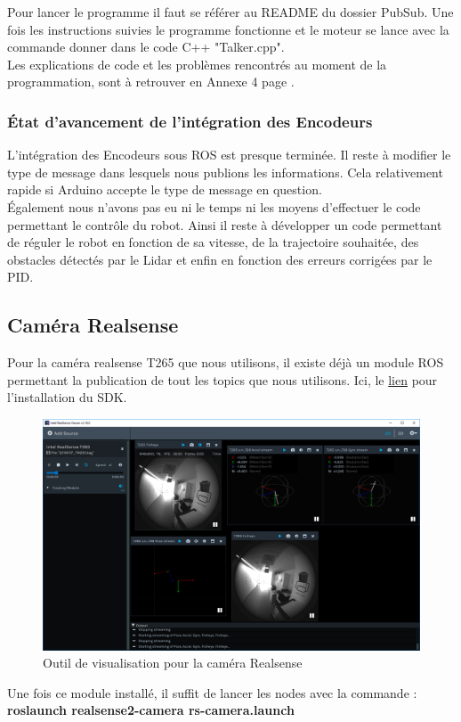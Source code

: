 \documentclass[french]{rapportENSTAB}
\begin{document}
Pour lancer le programme il faut se référer au README du dossier PubSub. Une fois les instructions suivies le programme fonctionne et le moteur se lance avec la commande donner dans le code C++ "Talker.cpp".\\

Les explications de code et les problèmes rencontrés au moment de la programmation, sont à retrouver en Annexe 4 page \pageref{annexe4}.\\


\subsubsection{État d'avancement de l'intégration des Encodeurs}
L'intégration des Encodeurs sous ROS est presque terminée. Il reste à modifier le type de message dans lesquels nous publions les informations. Cela relativement rapide si Arduino accepte le type de message en question.\\

Également nous n'avons pas eu ni le temps ni les moyens d'effectuer le code permettant le contrôle du robot. Ainsi il reste à développer un code permettant de réguler le robot en fonction de sa vitesse, de la trajectoire souhaitée, des obstacles détectés par le Lidar et enfin en fonction des erreurs corrigées par le PID.

\subsection{Caméra Realsense}
Pour la caméra realsense T265 que nous utilisons, il existe déjà un module ROS permettant la publication de tout les topics que nous utilisons. Ici, le  \href{https://github.com/IntelRealSense/realsense-ros}{lien} pour l’installation du SDK. \\


\begin{figure}[H]
    \centering
    \includegraphics[scale=0.25]{images/robot/realsense-viewer.png}
    \caption{Outil de visualisation pour la caméra Realsense}
    \label{fig:archi elec}
\end{figure}
Une fois ce module installé, il suffit de lancer les nodes avec la commande : \\
\textbf{roslaunch realsense2-camera rs-camera.launch} \\
\end{document}
